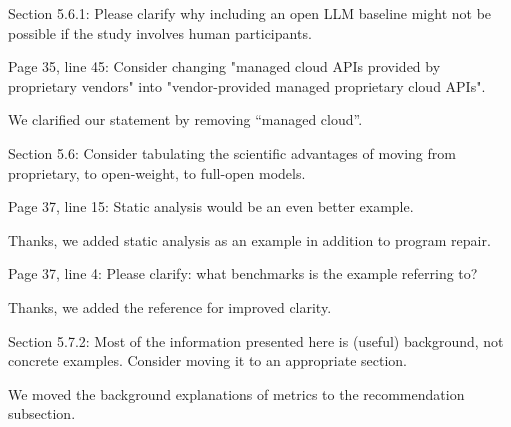 \documentclass[12pt,english]{reviewresponse}
\begin{document}
\begin{revcomment}
Section 5.6.1: Please clarify why including an open LLM baseline might not be possible if the study involves human participants.
\end{revcomment}
\begin{revresponse}
\end{revresponse}

\begin{revcomment}
Page 35, line 45: Consider changing "managed cloud APIs provided by proprietary vendors" into "vendor-provided managed proprietary cloud APIs".
\end{revcomment}
\begin{revresponse}
    We clarified our statement by removing ``managed cloud''.  
\end{revresponse}

\begin{revcomment}
Section 5.6: Consider tabulating the scientific advantages of moving from proprietary, to open-weight, to full-open models.
\end{revcomment}
\begin{revresponse}
\end{revresponse}

\begin{revcomment}
Page 37, line 15: Static analysis would be an even better example.
\end{revcomment}
\begin{revresponse}
    Thanks, we added static analysis as an example in addition to program repair.
\end{revresponse}

\begin{revcomment}
Page 37, line 4: Please clarify: what benchmarks is the example referring to?
\end{revcomment}
\begin{revresponse}
    Thanks, we added the reference for improved clarity.
\end{revresponse}

\begin{revcomment}
Section 5.7.2: Most of the information presented here is (useful) background, not concrete examples. Consider moving it to an appropriate section.
\end{revcomment}
\begin{revresponse}
    We moved the background explanations of  metrics to the recommendation subsection.
\end{revresponse}
\end{document}
